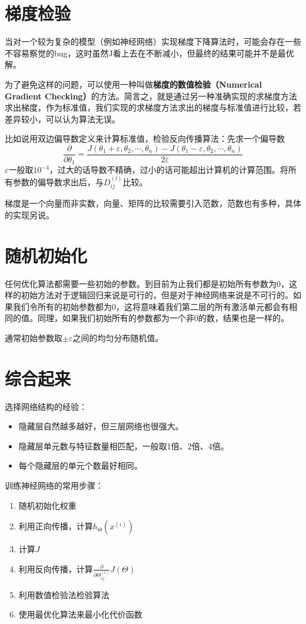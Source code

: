 \documentclass[../main.tex]{subfiles}
\begin{document}
\section{梯度检验}
当对一个较为复杂的模型（例如神经网络）实现梯度下降算法时，可能会存在一些不容易察觉的bug，这时虽然J看上去在不断减小，但最终的结果可能并不是最优解。


为了避免这样的问题，可以使用一种叫做\textbf{梯度的数值检验（Numerical Gradient Checking）}的方法。简言之，就是通过另一种准确实现的求梯度方法求出梯度，作为标准值，我们实现的求梯度方法求出的梯度与标准值进行比较，若差异较小，可以认为算法无误。


比如说用双边偏导数定义来计算标准值，检验反向传播算法：先求一个偏导数\[
    \frac{∂}{∂θ_1} = \frac{J(θ_1+ε, θ_2, ⋯ , θ_n) - J(θ_1-ε, θ_2, ⋯ , θ_n)}{2ε}
\]\(ε\)一般取\(10^{-4}\)，过大的话导数不精确，过小的话可能超出计算机的计算范围。将所有参数的偏导数求出后，与\(D^{(l)}_{ij}\)比较。


梯度是一个向量而非实数，向量、矩阵的比较需要引入范数，范数也有多种，具体的实现另说。
\section{随机初始化}
任何优化算法都需要一些初始的参数。到目前为止我们都是初始所有参数为0，这样的初始方法对于逻辑回归来说是可行的，但是对于神经网络来说是不可行的。如果我们令所有的初始参数都为0，这将意味着我们第二层的所有激活单元都会有相同的值。同理，如果我们初始所有的参数都为一个非0的数，结果也是一样的。

通常初始参数取\(±ε\)之间的均匀分布随机值。

\section{综合起来}
选择网络结构的经验：
\begin{itemize}
    \item 隐藏层自然越多越好，但三层网络也很强大。
    \item 隐藏层单元数与特征数量相匹配，一般取1倍、2倍、4倍。
    \item 每个隐藏层的单元个数最好相同。
\end{itemize}
训练神经网络的常用步骤：
\begin{enumerate}
    \item 随机初始化权重
    \item 利用正向传播，计算\(h_Θ(x^{(i)})\)
    \item 计算\(J\)
    \item 利用反向传播，计算\(\frac{∂}{∂Θ^{(l)}_{ij}}J(Θ)\)
    \item 利用数值检验法检验算法
    \item 使用最优化算法来最小化代价函数
\end{enumerate}
\end{document}
